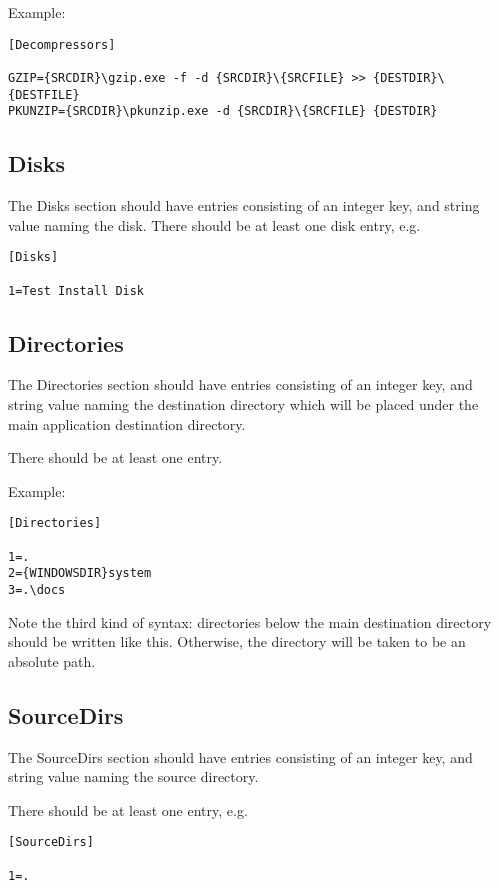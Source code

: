 Example:

\begin{verbatim}
[Decompressors]

GZIP={SRCDIR}\gzip.exe -f -d {SRCDIR}\{SRCFILE} >> {DESTDIR}\{DESTFILE}
PKUNZIP={SRCDIR}\pkunzip.exe -d {SRCDIR}\{SRCFILE} {DESTDIR}
\end{verbatim}

\subsection{Disks}

The Disks section should have entries consisting of
an integer key, and string value naming the disk.
There should be at least one disk entry, e.g.

\begin{verbatim}
[Disks] 

1=Test Install Disk
\end{verbatim}

\subsection{Directories}

The Directories section should have entries consisting of
an integer key, and string value naming the destination directory
which will be placed under the main application destination
directory.

There should be at least one entry.

Example:

\begin{verbatim}
[Directories] 

1=.
2={WINDOWSDIR}system
3=.\docs
\end{verbatim}

Note the third kind of syntax: directories below the main destination directory should
be written like this. Otherwise, the directory will be taken to be an absolute path.

\subsection{SourceDirs}

The SourceDirs section should have entries consisting of
an integer key, and string value naming the source directory.

There should be at least one entry, e.g.

\begin{verbatim}
[SourceDirs] 

1=.
\end{verbatim}

